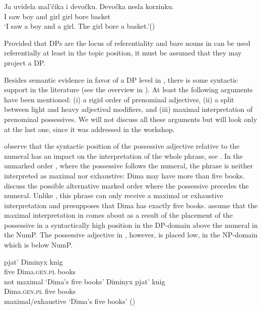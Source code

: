 \documentclass[output=paper]{langscibook}
\begin{document}
\ea \label{ex:2}
\gll Ja uvidela mal'čika i devočku. Devočka nesla korzinku. \\
    I saw boy and girl girl bore basket\\
\glt `I saw a boy and a girl. The girl bore a basket.'\hfill ()
\z

\noindent Provided that DPs are the locus of referentiality and bare nouns in  can be used referentially at least in the topic position, it must be assumed that they may project a DP.

Besides semantic evidence in favor of a DP level in , there is some syntactic support in the literature (see the overview in \citealt{Pereltsvaig2013}). At least the following arguments have been mentioned: (i) a rigid order of prenominal adjectives, (ii) a split between light and heavy adjectival modifiers, and (iii) maximal interpretation of prenominal possessives. We will not discuss all these arguments but will look only at the last one, since it was addressed in the workshop.

\cite{Kagan.Pereltsvaig2014} observe that the syntactic position of the possessive adjective relative to the numeral has an impact on the interpretation of the whole phrase, see . In the unmarked order , where the possessive follows the numeral, the phrase is neither interpreted as maximal nor exhaustive: Dima may have more than five books. \cite{Kagan.Pereltsvaig2014} discuss the possible alternative marked order  where the possessive precedes the numeral. Unlike , this phrase can only receive a maximal or exhaustive interpretation and presupposes that Dima has exactly five books. \cite{Kagan.Pereltsvaig2014} assume that the maximal interpretation in  comes about as a result of the placement of the possessive in a syntactically high position in the DP-domain above the numeral in the NumP. The possessive adjective in , however, is placed low, in the NP-domain which is below NumP.

\ea \label{ex:3}
\ea
\gll pjat' Diminyx knig \\
    five Dima.\textsc{gen.pl} books\\ \hfill not maximal
\glt `Dima’s five books' \label{ex:3a}
\ex \gll Diminyx pjat' knig \\
 Dima.\textsc{gen.pl} five books\\ \hfill maximal/exhaustive
\glt `Dima's five books' \hfill () \label{ex:3b}
\z \z
\end{document}
